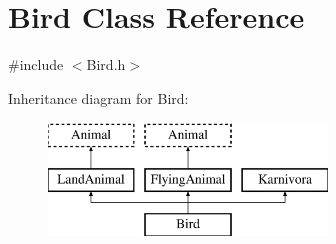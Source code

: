 \hypertarget{classBird}{\section{Bird Class Reference}
\label{classBird}
}


{\ttfamily \#include $<$Bird.\-h$>$}

Inheritance diagram for Bird\-:\begin{figure}[H]
\begin{center}
\leavevmode
\includegraphics[height=3.000000cm]{classBird}
\end{center}
\end{figure}

